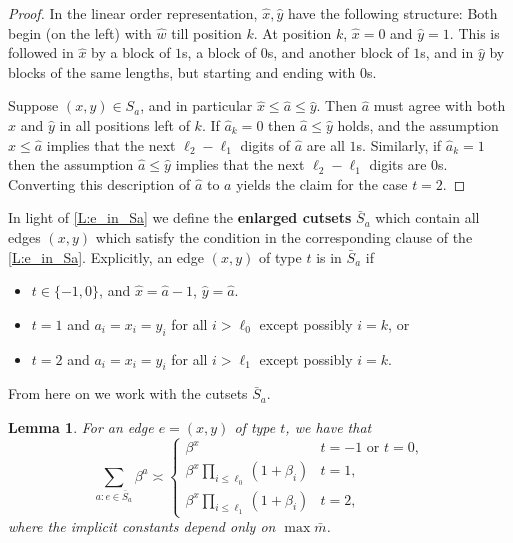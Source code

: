 \documentclass[12pt]{article}
\newtheorem{lemma}[thm]{Lemma}
\theoremstyle{definition}
\numberwithin{equation}{section}
\renewcommand{\hat}{\widehat}
\begin{document}
\begin{proof}
  In the linear order representation, $\hat{x},\hat{y}$ have the
  following structure:
  Both begin (on the left) with $\hat{w}$ till position $k$.
  At position $k$, $\hat{x}=0$ and $\hat{y}=1$.
  This is followed in $\hat{x}$ by a block of $1$s, a block of $0$s, and another block of $1$s, and in $\hat{y}$ by blocks of the same lengths, but starting and ending with $0$s.

  Suppose $(x,y)\in S_a$, and in particular $\hat{x} \leq \hat{a} \leq \hat{y}$.
  Then $\hat{a}$ must agree with both $\hat{x}$ and $\hat{y}$ in all positions left of $k$.
  If $\hat{a}_k=0$ then $\hat{a} \leq \hat{y}$ holds, and the assumption $\hat{x} \leq \hat{a}$ implies that the next
  $\ell_2-\ell_1$ digits of $\hat{a}$ are all $1$s.
  Similarly, if $\hat{a}_k=1$ then the assumption $\hat{a} \leq \hat{y}$ implies that the next $\ell_2-\ell_1$ digits are $0$s.
  Converting this description of $\hat{a}$ to $a$ yields the claim for the case $t=2$.
\end{proof}


In light of \cref{L:e_in_Sa} we define the \textbf{enlarged cutsets} $\bar S_a$ which contain all edges $(x,y)$ which satisfy the condition in the corresponding clause of the \cref{L:e_in_Sa}.
Explicitly, an edge $(x,y)$ of type $t$ is in $\bar S_a$ if
\begin{itemize}[nosep]
\item $t\in\{-1,0\}$, and $\hat x=\hat{a}-1$, $\hat y=\hat{a}$.
\item $t=1$ and $a_i=x_i=y_i$ for all $i>\ell_0$ except possibly $i=k$, or
\item $t=2$ and $a_i=x_i=y_i$ for all $i>\ell_1$ except possibly $i=k$.
\end{itemize}
From here on we work with the cutsets $\bar S_a$.


\begin{lemma}\label{L:cutset_count}
  For an edge $e=(x,y)$ of type $t$, we have that
  \[
  \sum_{a : e\in \bar S_a} \beta^a \asymp
  \begin{cases}
    \beta^x & t=-1 \text{ or } t=0, \\
    \beta^x \prod_{i\leq\ell_0} (1+\beta_i) & t=1, \\
    \beta^x \prod_{i\leq\ell_1} (1+\beta_i) & t=2,
  \end{cases}
  \]
  where the implicit constants depend only on $\max \bar m$.
\end{lemma}
\end{document}
